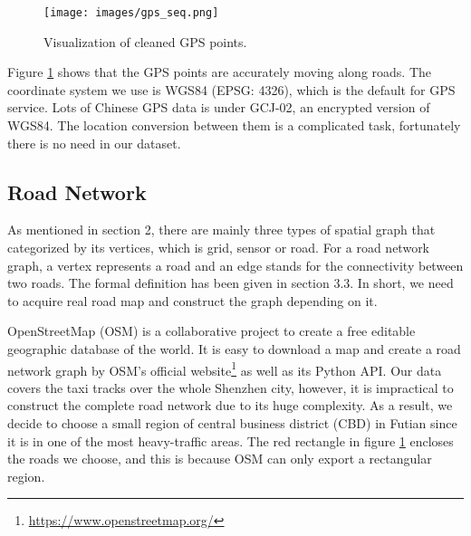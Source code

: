 \begin{figure}[htb]
  \centering
  \texttt{[image: images/gps\_seq.png]}
  \caption{Visualization of cleaned GPS points.}
  \label{fig: gps_seq}
\end{figure}

Figure \ref{fig: gps_seq} shows that the GPS points are accurately moving along roads. The coordinate system we use is WGS84 (EPSG: 4326), which is the default for GPS service. Lots of Chinese GPS data is under GCJ-02, an encrypted version of WGS84. The location conversion between them is a complicated task, fortunately there is no need in our dataset.

\subsection{Road Network}
As mentioned in section 2, there are mainly three types of spatial graph that categorized by its vertices, which is grid, sensor or road. For a road network graph, a vertex represents a road and an edge stands for the connectivity between two roads. The formal definition has been given in section 3.3. In short, we need to acquire real road map and construct the graph depending on it.

OpenStreetMap (OSM)\cite{osm} is a collaborative project to create a free editable geographic database of the world. It is easy to download a map and create a road network graph by OSM's official website\footnote{\href{https://www.openstreetmap.org/}{https://www.openstreetmap.org/}} as well as its Python API. Our data covers the taxi tracks over the whole Shenzhen city, however, it is impractical to construct the complete road network due to its huge complexity. As a result, we decide to choose a small region of central business district (CBD) in Futian since it is in one of the most heavy-traffic areas. The red rectangle in figure \ref{fig: gps_seq} encloses the roads we choose, and this is because OSM can only export a rectangular region. %

